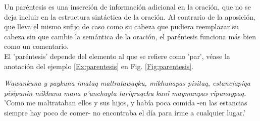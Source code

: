 \documentclass[a4paper,11pt,DIV12]{scrartcl}
\begin{document}
Un par\'entesis es una inserci\'on de informaci\'on adicional en la oraci\'on, que no se deja incluir en la estructura sint\'actica de la oraci\'on. Al contrario de la aposici\'on, que lleva el mismo sufijo de caso como su cabeza que pudiera reemplazar su cabeza sin que cambie la sem\'antica de la oraci\'on, el par\'entesis funciona m\'as bien como un comentario. \\
El 'par\'entesis' depende del elemento al que se refiere como 'par', v\'ease la anotaci\'on del ejemplo \ref{Ex:parentesis} en Fig. \ref{Fig:parentesis}.

\begin{examples}
 \item\label{Ex:parentesis} {\em Wawankuna y paykuna imataq maltratawaqku, mikhunapas pisitaq, estanciapiqa pisipunin mikhuna mana p'unchayta tariqraqchu kani maymanpas ripunaypaq.}\\
      'Como me maltrataban ellos y sus hijos, y había poca comida -en las estancias siempre hay poco de comer- no encontraba el día para irme a cualquier lugar.'\\
 	\hfill{\small \citep{Valderrama77}}
\end{examples}
\end{document}
